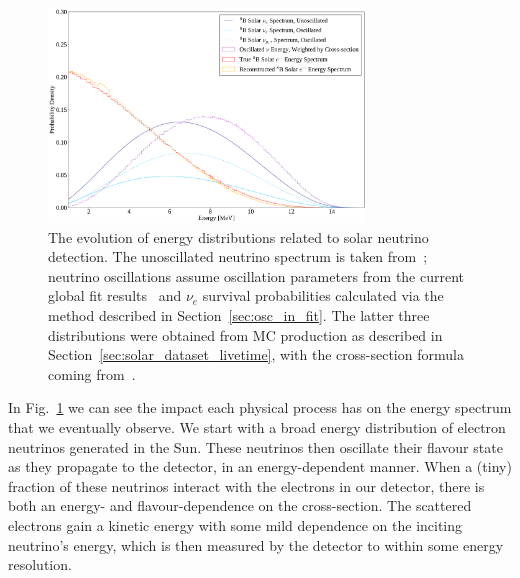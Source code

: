 \begin{figure}
    \centering
    \includegraphics[width=0.75\textwidth]{6_SolarAnalysis/images/b8_energy_evolution.pdf}
    \caption[The evolution of energy distributions related to \beight{} solar neutrino detection.]{The evolution of energy distributions related to \beight{} solar neutrino detection. The unoscillated neutrino spectrum is taken from~\cite{winterB8NeutrinoSpectrum2006}; %
    neutrino oscillations assume oscillation parameters from the current global fit results~\cite{estebanFateHintsUpdated2020} %
    and $\nu_{e}$ survival probabilities calculated via the method described in Section~\ref{sec:osc_in_fit}. The latter three distributions were obtained from MC production as described in Section~\ref{sec:solar_dataset_livetime}, with the cross-section formula coming from~\cite{bahcallSolarNeutrinosRadiative1995}.%
    }
    \label{fig:nu_elec_energy_dependence2}
\end{figure}

In Fig.~\ref{fig:nu_elec_energy_dependence2} we can see the impact each physical process has on the energy spectrum that we eventually observe. We start with a broad energy distribution of \beight{} electron neutrinos generated in the Sun. These neutrinos then oscillate their flavour state as they propagate to the detector, in an energy-dependent manner. When a (tiny) fraction of these neutrinos interact with the electrons in our detector, there is both an energy- and flavour-dependence on the cross-section. The scattered electrons gain a kinetic energy with some mild dependence on the inciting neutrino's energy, which is then measured by the detector to within some energy resolution.

